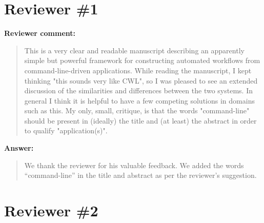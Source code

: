 \documentclass[a4]{article}
\newenvironment{review}%
{\textbf{Reviewer comment:}\begin{quote}}%
{\end{quote}}%
\newenvironment{answer}%
{\textbf{Answer:}\begin{small}\begin{quote}}%
{\end{quote}\end{small}}%
\begin{document}
\section{Reviewer \#1}

\begin{review}
This is a very clear and readable manuscript describing an apparently
simple but powerful framework for constructing automated workflows
from command-line-driven applications. While reading the manuscript, I
kept thinking "this sounds very like CWL", so I was pleased to see an
extended discussion of the similarities and differences between the
two systems. In general I think it is helpful to have a few competing
solutions in domains such as this. My only, small, critique, is that
the words "command-line" should be present in (ideally) the title and
(at least) the abstract in order to qualify "application(s)".
\end{review}

\begin{answer}
We thank the reviewer for his valuable feedback. We added the words
``command-line'' in the title and abstract as per the reviewer's
suggestion.
\end{answer}

\section{Reviewer \#2}
\end{document}
